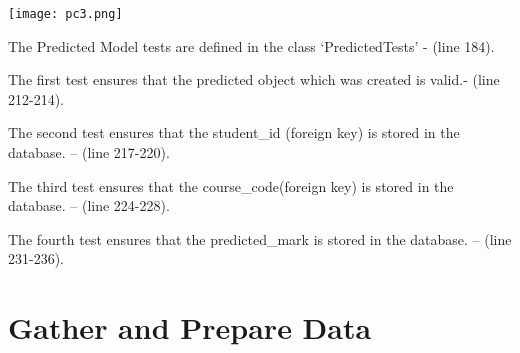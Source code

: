 \documentclass[10pt]{article}
\begin{document}
\begin{center}
\texttt{[image: pc3.png]}
\end{center}

\begin{description}[font=$\bullet$~\normalfont\scshape\color{red!50!black}]

\item [] The Predicted Model tests are defined in the class ‘PredictedTests’ - (line 184).
\item [] The first test ensures that the predicted object which was created is valid.- (line 212-214).
\item [] The second test ensures that the student\_id (foreign key) is stored in the database. – (line 217-220).
\item [] The third test ensures that the course\_code(foreign key) is stored in the database. – (line 224-228).
\item [] The fourth test ensures that the predicted\_mark is stored in the database. – (line 231-236).

\end{description}

\section{Gather and Prepare Data}
\end{document}
